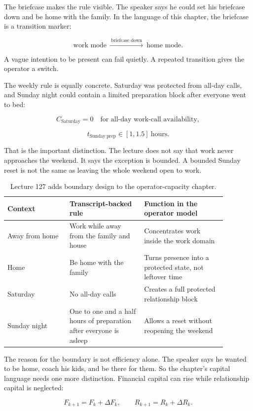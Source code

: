 \documentclass[11pt,oneside]{book}
\begin{document}
The briefcase makes the rule visible. The speaker says he could set his briefcase down and be home with the family. In the language of this chapter, the briefcase is a transition marker:

\[
\text{work mode}
\ \xrightarrow{\ \text{briefcase down}\ }\
\text{home mode}.
\]

A vague intention to be present can fail quietly. A repeated transition gives the operator a switch.

The weekly rule is equally concrete. Saturday was protected from all-day calls, and Sunday night could contain a limited preparation block after everyone went to bed:

\[
C_{\mathrm{Saturday}}=0
\quad
\text{for all-day work-call availability},
\]

\[
t_{\mathrm{Sunday\ prep}}
\in
[1,1.5]\ \text{hours}.
\]

That is the important distinction. The lecture does not say that work never approaches the weekend. It says the exception is bounded. A bounded Sunday reset is not the same as leaving the whole weekend open to work.

\begin{table}
\centering
\small
\begin{tabular}{p{0.25\linewidth}p{0.30\linewidth}p{0.33\linewidth}}
\hline
Context & Transcript-backed rule & Function in the operator model\\
\hline
Away from home & Work while away from the family and house & Concentrates work inside the work domain\\
Home & Be home with the family & Turns presence into a protected state, not leftover time\\
Saturday & No all-day calls & Creates a full protected relationship block\\
Sunday night & One to one and a half hours of preparation after everyone is asleep & Allows a reset without reopening the weekend\\
\hline
\end{tabular}
\caption{Lecture 127 adds boundary design to the operator-capacity chapter.}
\end{table}

The reason for the boundary is not efficiency alone. The speaker says he wanted to be home, coach his kids, and be there for them. So the chapter's capital language needs one more distinction. Financial capital can rise while relationship capital is neglected:

\[
F_{k+1}=F_k+\Delta F_k,
\qquad
R_{k+1}=R_k+\Delta R_k.
\]
\end{document}
